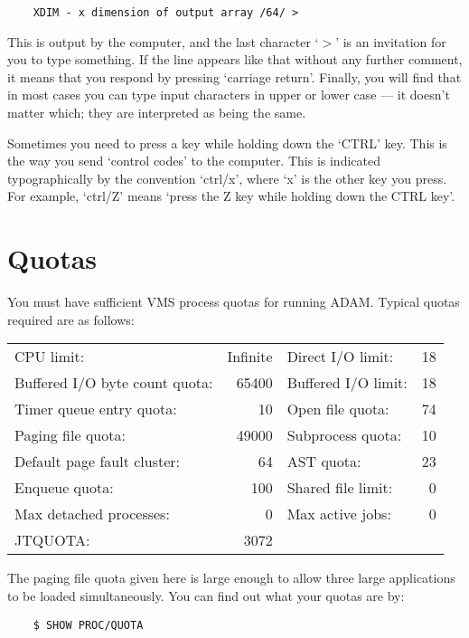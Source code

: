 \begin{small}
\begin{verbatim}
    XDIM - x dimension of output array /64/ >
\end{verbatim}
\end{small}

This is output by the computer, and the last character `$>$' is an invitation
for you to type something.
If the line appears like that without any further comment, it means that
you respond by pressing `carriage return'.
Finally, you will find that in most cases you can type input characters in
upper or lower case --- it doesn't matter which; they are interpreted as
being the same.

Sometimes you need to press a key while holding down the `CTRL' key.
This is the way you send `control codes' to the computer.
This is indicated typographically by the convention `ctrl/x', where `x' is
the other key you press.
For example, `ctrl/Z' means `press the Z key while holding down the CTRL key'.

\section{Quotas}
\label{S_quotas}

You must have sufficient VMS process quotas for running ADAM.
Typical quotas required are as follows:
\begin{center}
\begin{tabular}{|lr|lr|}
\hline
CPU limit: & Infinite & Direct I/O limit: & 18 \\
Buffered I/O byte count quota: & 65400 & Buffered I/O limit: & 18 \\
Timer queue entry quota: & 10 & Open file quota: & 74 \\
Paging file quota: & 49000 & Subprocess quota: & 10 \\
Default page fault cluster: & 64 & AST quota: & 23 \\
Enqueue quota: & 100 & Shared file limit: & 0 \\
Max detached processes: & 0 & Max active jobs: & 0 \\
JTQUOTA: & 3072 & & \\
\hline
\end{tabular}
\end{center}
The paging file quota given here is large enough to allow three large
applications to be loaded simultaneously.
You can find out what your quotas are by:

\begin{small}
\begin{verbatim}
    $ SHOW PROC/QUOTA
\end{verbatim}
\end{small}

